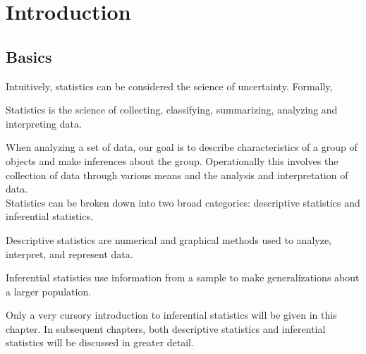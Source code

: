 \chapter{Introduction}
\label{sec.matrix}
\pagestyle{myheadings}  

\section{Basics}


Intuitively, statistics can be considered the science of uncertainty. Formally,


\begin{definition}[Statistics]	
Statistics is the science of collecting, classifying, summarizing, analyzing and interpreting data.
\end{definition}

When analyzing a set of data, our goal is to
describe characteristics of a group of objects and
make inferences about the group.
Operationally this involves the collection of data through various means and the analysis and interpretation of data.\\

Statistics can be broken down into two broad categories: descriptive statistics and inferential statistics.

\begin{definition}	
Descriptive statistics are numerical and graphical methods used to analyze, interpret, and represent data.
\end{definition}

\begin{definition}	
Inferential statistics use information from a sample to make generalizations about a larger population.
\end{definition}

Only a very cursory introduction to inferential statistics will be given in this chapter. In subsequent chapters, both descriptive statistics and inferential statistics will be discussed in greater detail.\\

